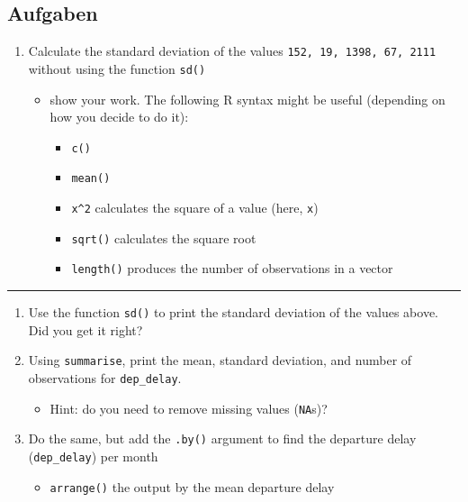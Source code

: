 \documentclass[
  letterpaper,
  DIV=11,
  numbers=noendperiod]{scrartcl}
\providecommand{\tightlist}{%
  \setlength{\itemsep}{0pt}\setlength{\parskip}{0pt}}\usepackage{longtable,booktabs,array}
\begin{document}
\hypertarget{aufgaben}{%
\subsection{Aufgaben}\label{aufgaben}}

\begin{enumerate}
\def\labelenumi{\arabic{enumi}.}
\tightlist
\item
  Calculate the standard deviation of the values
  \texttt{152,\ 19,\ 1398,\ 67,\ 2111} without using the function
  \texttt{sd()}

  \begin{itemize}
  \tightlist
  \item
    show your work. The following R syntax might be useful (depending on
    how you decide to do it):

    \begin{itemize}
    \tightlist
    \item
      \texttt{c()}
    \item
      \texttt{mean()}
    \item
      \texttt{x\^{}2} calculates the square of a value (here,
      \texttt{x})
    \item
      \texttt{sqrt()} calculates the square root
    \item
      \texttt{length()} produces the number of observations in a vector
    \end{itemize}
  \end{itemize}
\end{enumerate}

\begin{center}\rule{0.5\linewidth}{0.5pt}\end{center}

\begin{enumerate}
\def\labelenumi{\arabic{enumi}.}
\setcounter{enumi}{1}
\tightlist
\item
  Use the function \texttt{sd()} to print the standard deviation of the
  values above. Did you get it right?
\item
  Using \texttt{summarise}, print the mean, standard deviation, and
  number of observations for \texttt{dep\_delay}.

  \begin{itemize}
  \tightlist
  \item
    Hint: do you need to remove missing values (\texttt{NA}s)?
  \end{itemize}
\item
  Do the same, but add the \texttt{.by()} argument to find the departure
  delay (\texttt{dep\_delay}) per month

  \begin{itemize}
  \tightlist
  \item
    \texttt{arrange()} the output by the mean departure delay
  \end{itemize}
\end{enumerate}
\end{document}
